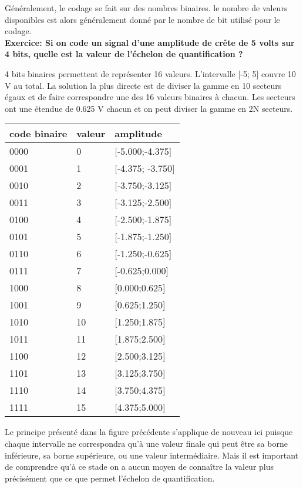 \documentclass[11pt,a4paper]{article}
\begin{document}
Généralement, le codage se fait sur des nombres binaires. le nombre de valeurs disponibles est alors généralement donné par le nombre de bit utilisé pour le codage.\\

\textbf{Exercice: Si on code un signal d'une amplitude de crête de 5 volts sur 4 bits, quelle est la valeur de l'échelon de quantification ?}

4 bits binaires permettent de représenter 16 valeurs. L'intervalle [-5; 5] couvre 10 V au total. La solution la plus directe est de diviser la gamme en 10 secteurs égaux et de faire correspondre une des 16 valeurs binaires à chacun. Les secteurs ont une étendue de 0.625 V chacun et on peut diviser la gamme en 2N secteurs.

\begin{table}[h!]
\begin{center}
\begin{tabular}{|p{20mm}|p{10mm}|p{25mm}|}
 \hline
 code binaire &  valeur & amplitude \\
 \hline
 0000 & 0 &  [-5.000;-4.375] \\
 \hline
 0001 & 1 & [-4.375; -3.750]\\
 \hline
 0010 & 2 & [-3.750;-3.125]\\
 \hline
 0011 & 3 & [-3.125;-2.500]\\
 \hline
 0100 & 4 & [-2.500;-1.875]\\
 \hline
 0101 & 5 & [-1.875;-1.250]\\
 \hline
 0110 & 6 & [-1.250;-0.625]\\
 \hline
 0111 & 7 & [-0.625;0.000]\\
 \hline
 1000 & 8 &  [0.000;0.625]\\
 \hline
 1001 & 9 &  [0.625;1.250]\\
 \hline
 1010 & 10 & [1.250;1.875]\\
 \hline
 1011 & 11 & [1.875;2.500]\\
 \hline
 1100 & 12 & [2.500;3.125]\\
 \hline
 1101 & 13 & [3.125;3.750]\\
 \hline
 1110 & 14 & [3.750;4.375]\\
 \hline
 1111 & 15 & [4.375;5.000]\\
 \hline 
\end{tabular}
\end{center}
\end{table}

Le principe présenté dans la figure précédente s'applique de nouveau ici puisque chaque intervalle ne correspondra qu'à une valeur finale qui peut être sa borne inférieure, sa borne supérieure, ou une valeur intermédiaire. Mais il est important de comprendre qu'à ce stade on a aucun moyen de connaître la valeur plus précisément que ce que permet l'échelon de quantification.\\
\end{document}
